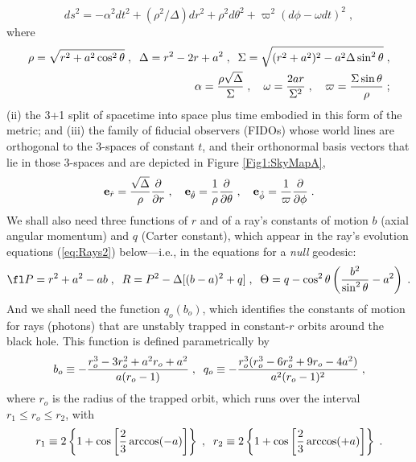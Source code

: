 \documentclass[12pt]{iopart}
\begin{document}
\begin{equation}
ds^2 = -\alpha^2 dt^2 + (\rho^2/\Delta)dr^2 + \rho^2 d\theta^2 + \varpi^2 (d\phi - \omega dt)^2
\;,
\end{equation} 
where
\begin{eqnarray}
\rho = \sqrt{r^2 + a^2 \cos^2\theta}\;, \;\;
\Delta = r^2 -2r+a^2\;, \;\;
\Sigma=\sqrt{(r^2+a^2)^2 -a^2 \Delta \sin^2\theta}\;, \nonumber \\
\alpha={\rho \sqrt{\Delta}\over\Sigma}\;, \quad
\omega = {2 a r \over \Sigma^2} \;, \quad
\varpi =  {\Sigma \sin\theta \over \rho}\;;
\label{eq:KerrQuantities}
\end{eqnarray}
(ii) the 3+1 split of spacetime into space plus time embodied in this form of the metric; and (iii) 
the family of fiducial observers (FIDOs) whose world lines are orthogonal to the
3-spaces of constant $t$, and their orthonormal basis vectors that lie in those 3-spaces
and are depicted in Figure \ref{Fig1:SkyMapA},
\begin{equation}
{\bf e}_{\hat r} = {\sqrt{\Delta}\over\rho} {\partial\over\partial r}\;, \quad
{\bf e}_{\hat \theta} = {1\over\rho}{\partial\over\partial \theta}\;, \quad
{\bf e}_{\hat \phi} = {1\over \varpi}{\partial\over\partial \phi}\;.
\label{eq:FIDObasis}
\end{equation}
We shall also need
three functions of $r$ and of a ray's constants of motion $b$ (axial angular momentum)
and $q$ (Carter constant), which appear in the ray's evolution equations (\ref{eq:Rays2}) below---i.e., in the equations for a \emph{null} geodesic:
\begin{equation}
\fl
P = r^2+a^2 - a b\;,\;\;
R = P^2 - \Delta[(b-a)^2+q]\;, \;\;
\Theta = q-\cos^2\theta\left({b^2\over\sin^2\theta} - a^2\right)\;.
\label{eqs:PRTheta}
\end{equation}
And we shall need the function $q_o(b_o)$, which identifies the constants of motion for rays (photons) that are unstably trapped in constant-$r$ orbits around the black hole.  This function
is defined parametrically by \cite{Teo}
\begin{equation}
b_o  \equiv -{r_o^3-3 r_o^2 + a^2 r_o + a^2 \over a(r_o-1)} \;,\;\;
q_o \equiv - {r_o^3(r_o^3 - 6 r_o^2 + 9 r_o - 4a^2)\over a^2(r_o-1)^2}\;,
\label{eq:boqo}
\end{equation}
where $r_o$ is the radius of the trapped orbit, which runs over the interval 
$r_1  \le  r_o \le r_2 $, with
\begin{equation}
r_1 \equiv 2 \left\{1 + \cos\left[{2\over3} \arccos(-a)\right]\right\}\;, \;\;
r_2  \equiv 2 \left\{1 + \cos\left[{2\over3} \arccos(+a)\right]\right\}\;. 
\label{eq:r1r2}
\end{equation}
\end{document}
